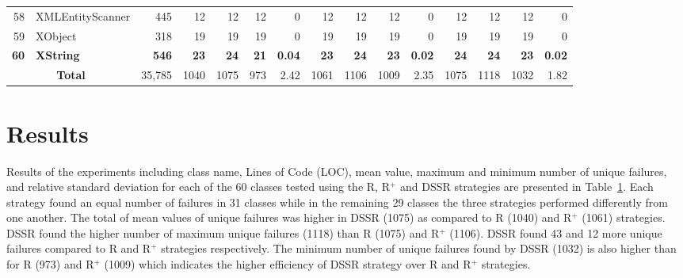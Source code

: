 \begin{table} [htp!]
{\begin{tabularx}{1 \textwidth}{r l r r r r r r r r r r r r r}
58						& XMLEntityScanner			&445		& 12		&	12	&	12	& 	0					& 12		&  12		& 12		& 		0			& 12			& 12			& 12			&	0\\      
59						& XObject					&318		& 19		&	19	&	19	& 	0					& 19		&  19		& 19		& 		0			& 19			& 19			& 19			&	0\\      
\textbf{60}						& \textbf{XString}					&\textbf{546}		& \textbf{23}		&	\textbf{24}	&	\textbf{21}	& 	\textbf{0.04}					& \textbf{23}		&  \textbf{24}		& \textbf{23}		& 		\textbf{0.02}			& \textbf{24}			& \textbf{24}			& \textbf{23}			&	\textbf{0.02}\\      

    						\multicolumn{2}{c}{\textbf{Total}}	&35,785	&1040	&	1075	&    973	&	2.42				& 1061	&1106	&1009	&		2.35		& 1075		& 1118		& 1032		& 	1.82\\
     \end{tabularx} }
    \bigskip
    \label{table:Results}
\end{table}

\section{Results}\label{sec:res}
Results of the experiments including class name, Lines of Code (LOC), mean value, maximum and minimum number of unique failures, and relative standard deviation for each of the 60 classes tested using the R, R$^+$ and DSSR strategies are presented in Table~\ref{table:Results}. Each strategy found an equal number of failures in 31 classes while in the remaining 29 classes the three strategies performed differently from one another. The total of mean values of unique failures was higher in DSSR (1075) as compared to R (1040) and R$^+$ (1061) strategies. 
DSSR found the higher number of maximum unique failures (1118) than R (1075) and R$^+$ (1106). DSSR found 43 and 12 more unique failures compared to R and R$^+$ strategies respectively. The minimum number of unique failures found by DSSR (1032) is also higher than for R (973) and R$^+$ (1009) which indicates the higher efficiency of DSSR strategy over R and R$^+$ strategies. 


